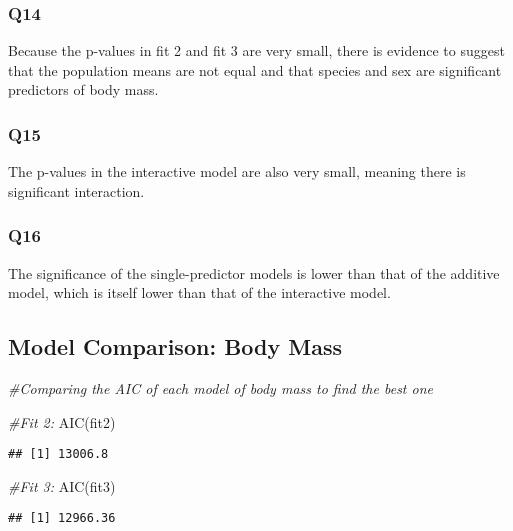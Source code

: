 \documentclass[
]{article}
\newenvironment{Shaded}{\begin{snugshade}}{\end{snugshade}}
\newcommand{\CommentTok}[1]{\textcolor[rgb]{0.56,0.35,0.01}{\textit{#1}}}
\newcommand{\FunctionTok}[1]{\textcolor[rgb]{0.00,0.00,0.00}{#1}}
\newcommand{\NormalTok}[1]{#1}
\begin{document}
\hypertarget{q14}{%
\subsubsection{Q14}\label{q14}}

Because the p-values in fit 2 and fit 3 are very small, there is
evidence to suggest that the population means are not equal and that
species and sex are significant predictors of body mass.

\hypertarget{q15}{%
\subsubsection{Q15}\label{q15}}

The p-values in the interactive model are also very small, meaning there
is significant interaction.

\hypertarget{q16}{%
\subsubsection{Q16}\label{q16}}

The significance of the single-predictor models is lower than that of
the additive model, which is itself lower than that of the interactive
model.

\hypertarget{model-comparison-body-mass}{%
\subsection{Model Comparison: Body
Mass}\label{model-comparison-body-mass}}

\begin{Shaded}
\begin{Highlighting}[]
\CommentTok{\#Comparing the AIC of each model of body mass to find the best one}

\CommentTok{\#Fit 2:}
\FunctionTok{AIC}\NormalTok{(fit2)}
\end{Highlighting}
\end{Shaded}

\begin{verbatim}
## [1] 13006.8
\end{verbatim}

\begin{Shaded}
\begin{Highlighting}[]
\CommentTok{\#Fit 3:}
\FunctionTok{AIC}\NormalTok{(fit3)}
\end{Highlighting}
\end{Shaded}

\begin{verbatim}
## [1] 12966.36
\end{verbatim}
\end{document}
